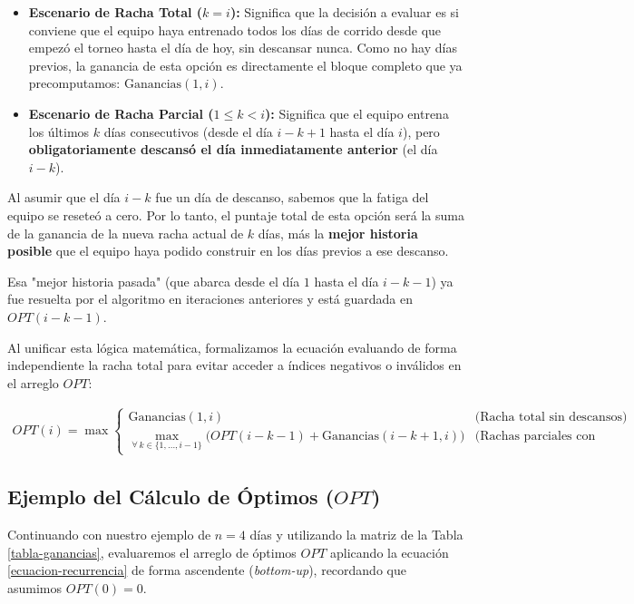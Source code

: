 \begin{itemize}
    \item \textbf{Escenario de Racha Total ($k=i$):} 
    Significa que la decisión a evaluar es si conviene que el equipo haya entrenado todos los días de corrido desde que empezó el torneo hasta el día de hoy, sin descansar nunca. Como no hay días previos, la ganancia de esta opción es directamente el bloque completo que ya precomputamos: $\text{Ganancias}(1, i)$.

    \item \textbf{Escenario de Racha Parcial ($1 \le k < i$):} 
    Significa que el equipo entrena los últimos $k$ días consecutivos (desde el día $i-k+1$ hasta el día $i$), pero \textbf{obligatoriamente descansó el día inmediatamente anterior} (el día $i-k$). 
\end{itemize}

Al asumir que el día $i-k$ fue un día de descanso, sabemos que la fatiga del equipo se reseteó a cero. Por lo tanto, el puntaje total de esta opción será la suma de la ganancia de la nueva racha actual de $k$ días, más la \textbf{mejor historia posible} que el equipo haya podido construir en los días previos a ese descanso. 

Esa "mejor historia pasada" (que abarca desde el día $1$ hasta el día $i-k-1$) ya fue resuelta por el algoritmo en iteraciones anteriores y está guardada en $OPT(i-k-1)$.

Al unificar esta lógica matemática, formalizamos la ecuación evaluando de forma independiente la racha total para evitar acceder a índices negativos o inválidos en el arreglo $OPT$:

\begin{eqnarray}
OPT(i) = \max 
\begin{cases} 
\text{Ganancias}(1, i) & \text{(Racha total sin descansos)} \\
\max_{\forall\, k \in \{1,\dots,i-1\}} \Big( OPT(i - k - 1) + \text{Ganancias}(i-k+1, i) \Big) & \text{(Rachas parciales con descanso previo)}
\end{cases}
\label{ecuacion-recurrencia}
\end{eqnarray}

\subsection{Ejemplo del Cálculo de Óptimos ($OPT$)}

Continuando con nuestro ejemplo de $n=4$ días y utilizando la matriz de la Tabla \ref{tabla-ganancias}, evaluaremos el arreglo de óptimos $OPT$ aplicando la ecuación \eqref{ecuacion-recurrencia} de forma ascendente (\textit{bottom-up}), recordando que asumimos $OPT(0) = 0$.

